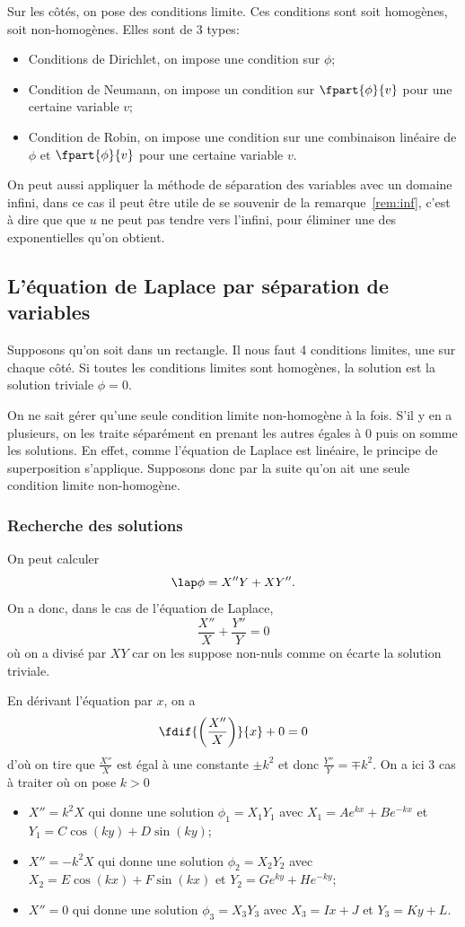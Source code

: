 Sur les côtés, on pose des conditions limite.
Ces conditions sont soit homogènes, soit non-homogènes.
Elles sont de 3 types:
\begin{itemize}
  \item Conditions de Dirichlet,
    on impose une condition sur $\phi$;
  \item Condition de Neumann,
    on impose un condition sur $\fpart{\phi}{v}$ pour
    une certaine variable $v$;
  \item Condition de Robin,
    on impose une condition sur une combinaison linéaire de
    $\phi$ et $\fpart{\phi}{v}$ pour une certaine variable $v$.
\end{itemize}

On peut aussi appliquer la méthode de séparation des variables
avec un domaine infini, dans ce cas il peut être utile
de se souvenir de la remarque~\ref{rem:inf}, c'est à dire
que que $u$ ne peut pas tendre vers l'infini,
pour éliminer une des exponentielles qu'on obtient.

\subsection{L'équation de Laplace par séparation de variables}
Supposons qu'on soit dans un rectangle.
Il nous faut 4 conditions limites, une sur chaque côté.
Si toutes les conditions limites sont homogènes, la solution est la solution
triviale $\phi = 0$.

On ne sait gérer qu'une seule condition limite non-homogène à la fois.
S'il y en a plusieurs, on les traite séparément en prenant les autres
égales à 0 puis on somme les solutions.
En effet, comme l'équation de Laplace est linéaire, le principe
de superposition s'applique.
Supposons donc par la suite qu'on ait une seule condition limite non-homogène.

\subsubsection{Recherche des solutions}
On peut calculer
\[ \lap \phi = X'' Y + X Y''. \]
On a donc, dans le cas de l'équation de Laplace,
\[ \frac{X''}{X} + \frac{Y''}{Y} = 0 \]
où on a divisé par $XY$ car on les suppose non-nuls comme on
écarte la solution triviale.

En dérivant l'équation par $x$, on a
\[ \fdif{\left(\frac{X''}{X}\right)}{x} + 0 = 0 \]
d'où on tire que $\frac{X''}{X}$ est égal à une constante $\pm k^2$
et donc $\frac{Y''}{Y} = \mp k^2$.
On a ici 3 cas à traiter où on pose $k > 0$
\begin{itemize}
  \item $X'' = k^2X$ qui donne une solution $\phi_1 = X_1Y_1$
    avec $X_1 = Ae^{kx} + Be^{-kx}$ et $Y_1 = C\cos(ky) + D\sin(ky)$;
  \item $X'' = -k^2X$ qui donne une solution $\phi_2 = X_2Y_2$
    avec $X_2 = E\cos(kx) + F\sin(kx)$ et $Y_2 = Ge^{ky} + He^{-ky}$;
  \item $X'' = 0$ qui donne une solution $\phi_3 = X_3Y_3$
    avec $X_3 = Ix + J$ et $Y_3 = Ky + L$.
\end{itemize}

